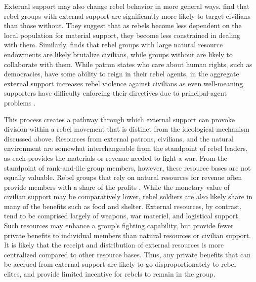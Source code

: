 
External support may also change rebel behavior in more general ways. \citet{Salehyan2014a} find that rebel groups with external support are significantly more likely to target civilians than those without. They suggest that as rebels become less dependent on the local population for material support, they become less constrained in dealing with them. Similarly, \citet{Weinstein2007} finds that rebel groups with large natural resource endowments are likely brutalize civilians, while groups without are likely to collaborate with them. While patron states who care about human rights, such as democracies, have some ability to reign in their rebel agents, in the aggregate external support increases rebel violence against civilians as even well-meaning supporters have difficulty enforcing their directives due to principal-agent problems \citep{Salehyan2014a}.

This process creates a pathway through which external support can provoke division within a rebel movement that is distinct from the ideological mechanism discussed above. Resources from external patrons, civilians, and the natural environment are somewhat interchangeable from the standpoint of rebel leaders, as each provides the materials or revenue needed to fight a war. From the standpoint of rank-and-file group members, however, these resource bases are not equally valuable. Rebel groups that rely on natural resources for revenue often provide members with a share of the profits \citep{Weinstein2007}. While the monetary value of civilian support may be comparatively lower, rebel soldiers are also likely share in many of the benefits such as food and shelter. External resources, by contrast, tend to be comprised largely of weapons, war materiel, and logistical support. Such resources may enhance a group's fighting capability, but provide fewer private benefits to individual members than natural resources or civilian support. It is likely that the receipt and distribution of external resources is more centralized compared to other resource bases. Thus, any private benefits that can be accrued from external support are likely to go disproportionately to rebel elites, and provide limited incentive for rebels to remain in the group.

